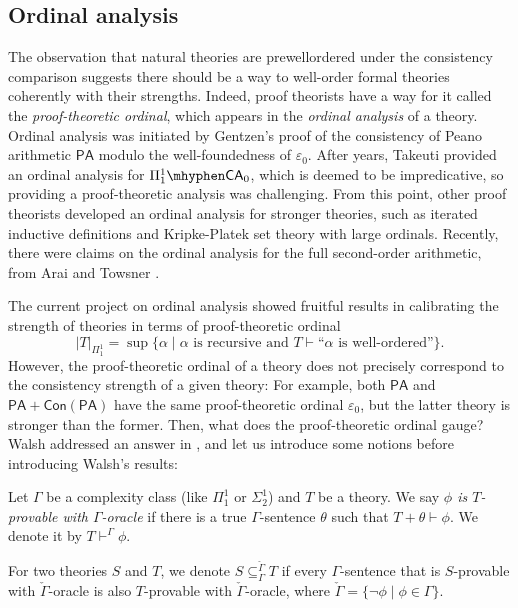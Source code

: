 \documentclass{mhkr}
\newcommand{\added}[1]{#1}
\newcommand{\CA}{\mathsf{CA}}
\newcommand{\PA}{\mathsf{PA}}
\begin{document}
\subsection{Ordinal analysis}
\added{The observation that natural theories are prewellordered under the consistency comparison} suggests there should be a way to well-order formal theories coherently with their strengths. Indeed, proof theorists have a way for it called the \emph{proof-theoretic ordinal}, which appears in the \emph{ordinal analysis} \added{of} a theory.
Ordinal analysis was initiated by Gentzen's proof of the consistency of Peano arithmetic $\PA$ modulo the well-foundedness of $\varepsilon_0$. After years, Takeuti \cite{Takeuti1967ConsistencySubsystemAnalysis} provided an ordinal analysis for $\Pi^1_1\mhyphen\CA_0$, which is deemed to be impredicative, so providing a proof-theoretic analysis was challenging. \added{From this point, other proof theorists developed an ordinal analysis for stronger theories, such as iterated inductive definitions and Kripke-Platek set theory with large ordinals.} Recently, there were claims on the ordinal analysis for the full second-order arithmetic, from  Arai \cite{Arai2023PiN} and Towsner \cite{Towsner2024ProofsModifyProofs}.

The current project on ordinal analysis showed fruitful results in calibrating the strength of theories in terms of proof-theoretic ordinal
\begin{equation*}
    |T|_{\Pi^1_1} = \sup \{\alpha\mid \text{$\alpha$ is recursive and } T\vdash\text{``$\alpha$ is well-ordered''}\}.
\end{equation*}
However, the proof-theoretic ordinal of a theory does not precisely correspond to the consistency strength of a given theory: For example, both $\mathsf{PA}$ and $\mathsf{PA + Con(PA)}$ have the same proof-theoretic ordinal $\varepsilon_0$, but the latter theory is stronger than the former. Then, what does the proof-theoretic ordinal gauge? Walsh addressed an answer in \cite{Walsh2023characterizations}, \added{and let us introduce some notions before introducing Walsh's results:}
\begin{definition}
    Let $\Gamma$ be a complexity class (like $\Pi^1_1$ or $\Sigma^1_2$) and $T$ be a theory. We say \emph{$\phi$ is $T$-provable with $\Gamma$-oracle} if there is a true $\Gamma$-sentence $\theta$ such that $T + \theta \vdash \phi$. We denote it by $T \vdash^\Gamma \phi$.

    For two theories $S$ and $T$, we denote $S \subseteq^{\check{\Gamma}}_\Gamma T$ if every $\Gamma$-sentence that is $S$-provable with $\check{\Gamma}$-oracle is also $T$-provable with $\check{\Gamma}$-oracle, where $\check{\Gamma} = \{\lnot\phi\mid \phi\in \Gamma\}$.
\end{definition}
\end{document}
